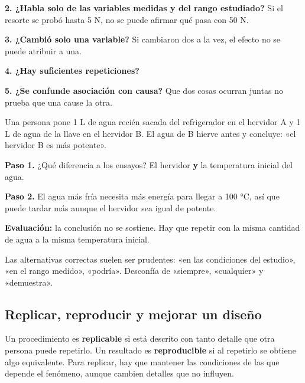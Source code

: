\textbf{2. ¿Habla solo de las variables medidas y del rango estudiado?} Si el resorte se probó hasta 5 N, no se puede afirmar qué pasa con 50 N.

 

\textbf{3. ¿Cambió solo una variable?} Si cambiaron dos a la vez, el efecto no se puede atribuir a una.

 

\textbf{4. ¿Hay suficientes repeticiones?}

 

\textbf{5. ¿Se confunde asociación con causa?} Que dos cosas ocurran juntas no prueba que una cause la otra.

  
\begin{ejemplo} Una persona pone 1 L de agua recién sacada del refrigerador en el hervidor A y 1 L de agua de la llave en el hervidor B. El agua de B hierve antes y concluye: «el hervidor B es más potente».\par \textbf{Paso 1.} ¿Qué diferencia a los ensayos? El hervidor \textbf{y} la temperatura inicial del agua.\par \textbf{Paso 2.} El agua más fría necesita más energía para llegar a 100 °C, así que puede tardar más aunque el hervidor sea igual de potente.\par \textbf{Evaluación:} la conclusión no se sostiene. Hay que repetir con la misma cantidad de agua a la misma temperatura inicial.\end{ejemplo}
 
\begin{clave}[{Recuerda}] Las alternativas correctas suelen ser prudentes: «en las condiciones del estudio», «en el rango medido», «podría». Desconfía de «siempre», «cualquier» y «demuestra».\end{clave}
\subsection{Replicar, reproducir y mejorar un diseño}
Un procedimiento es \textbf{replicable} si está descrito con tanto detalle que otra persona puede repetirlo. Un resultado es \textbf{reproducible} si al repetirlo se obtiene algo equivalente. Para replicar, hay que mantener las condiciones de las que depende el fenómeno, aunque cambien detalles que no influyen.

